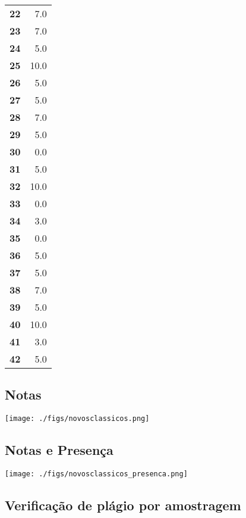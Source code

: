 \documentclass[11pt]{article}
\begin{document}
\begin{center}
\begin{longtable}{lr}
\textbf{22} &                      7.0 \\
\textbf{23} &                      7.0 \\
\textbf{24} &                      5.0 \\
\textbf{25} &                     10.0 \\
\textbf{26} &                      5.0 \\
\textbf{27} &                      5.0 \\
\textbf{28} &                      7.0 \\
\textbf{29} &                      5.0 \\
\textbf{30} &                      0.0 \\
\textbf{31} &                      5.0 \\
\textbf{32} &                     10.0 \\
\textbf{33} &                      0.0 \\
\textbf{34} &                      3.0 \\
\textbf{35} &                      0.0 \\
\textbf{36} &                      5.0 \\
\textbf{37} &                      5.0 \\
\textbf{38} &                      7.0 \\
\textbf{39} &                      5.0 \\
\textbf{40} &                     10.0 \\
\textbf{41} &                      3.0 \\
\textbf{42} &                      5.0 \\
\end{longtable}
\end{center}
\subsection{Notas}
\label{sec:orgd558929}
\begin{center}
\texttt{[image: ./figs/novosclassicos.png]}
\end{center}
\subsection{Notas e Presença}
\label{sec:orge18a3be}
\begin{center}
\texttt{[image: ./figs/novosclassicos\_presenca.png]}
\end{center}
\subsection{Verificação de plágio por amostragem}
\label{sec:orga22f2a5}
\end{document}
